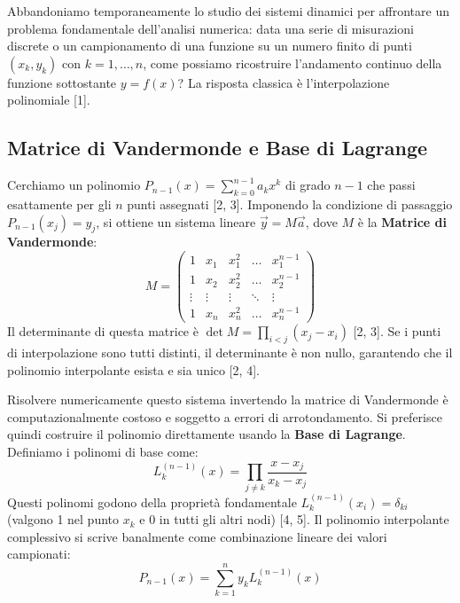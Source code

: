 \documentclass[12pt,a4paper]{article}
\begin{document}
Abbandoniamo temporaneamente lo studio dei sistemi dinamici per affrontare un problema fondamentale dell'analisi numerica: data una serie di misurazioni discrete o un campionamento di una funzione su un numero finito di punti $(x_k, y_k)$ con $k=1,\dots,n$, come possiamo ricostruire l'andamento continuo della funzione sottostante $y = f(x)$? La risposta classica è l'interpolazione polinomiale [1].

\subsection{Matrice di Vandermonde e Base di Lagrange}
Cerchiamo un polinomio $P_{n-1}(x) = \sum_{k=0}^{n-1} a_k x^k$ di grado $n-1$ che passi esattamente per gli $n$ punti assegnati [2, 3]. Imponendo la condizione di passaggio $P_{n-1}(x_j) = y_j$, si ottiene un sistema lineare $\vec{y} = M\vec{a}$, dove $M$ è la \textbf{Matrice di Vandermonde}:
\begin{equation}
M = 
\begin{pmatrix}
1 & x_1 & x_1^2 & \dots & x_1^{n-1} \\
1 & x_2 & x_2^2 & \dots & x_2^{n-1} \\
\vdots & \vdots & \vdots & \ddots & \vdots \\
1 & x_n & x_n^2 & \dots & x_n^{n-1}
\end{pmatrix}
\end{equation}
Il determinante di questa matrice è $\det M = \prod_{i < j} (x_j - x_i)$ [2, 3]. Se i punti di interpolazione sono tutti distinti, il determinante è non nullo, garantendo che il polinomio interpolante esista e sia unico [2, 4].

Risolvere numericamente questo sistema invertendo la matrice di Vandermonde è computazionalmente costoso e soggetto a errori di arrotondamento. Si preferisce quindi costruire il polinomio direttamente usando la \textbf{Base di Lagrange}. Definiamo i polinomi di base come:
\begin{equation}
L_k^{(n-1)}(x) = \prod_{j \neq k} \frac{x - x_j}{x_k - x_j}
\end{equation}
Questi polinomi godono della proprietà fondamentale $L_k^{(n-1)}(x_i) = \delta_{ki}$ (valgono 1 nel punto $x_k$ e 0 in tutti gli altri nodi) [4, 5]. Il polinomio interpolante complessivo si scrive banalmente come combinazione lineare dei valori campionati:
\begin{equation}
P_{n-1}(x) = \sum_{k=1}^n y_k L_k^{(n-1)}(x)
\end{equation}
\end{document}
